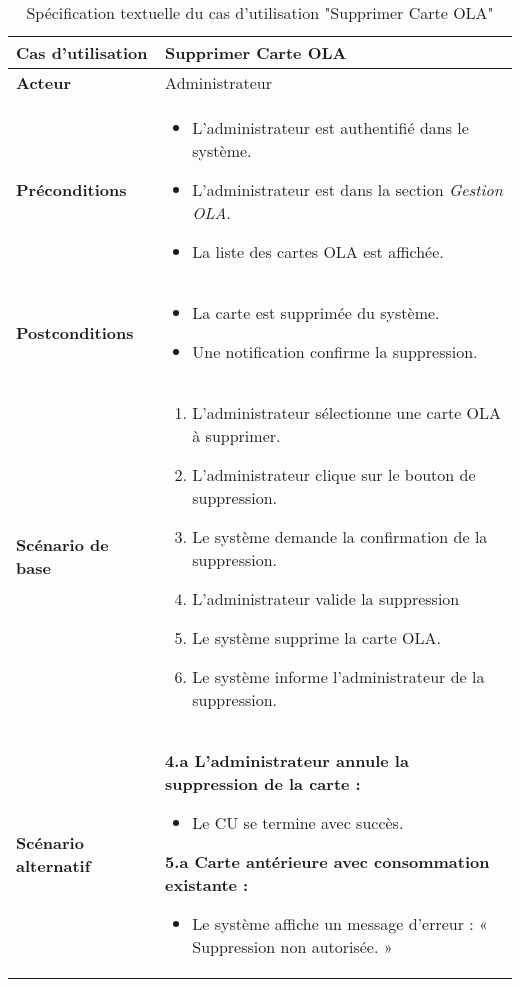 \documentclass[a4paper,11pt]{report}
\begin{document}
\begin{table}[H]
  \centering
  \renewcommand{\arraystretch}{1.5}
  \caption{Spécification textuelle du cas d'utilisation "Supprimer Carte OLA"}
  \begin{tabularx}{\textwidth}{|l|X|}
    \hline
    \textbf{Cas d'utilisation} & Supprimer Carte OLA \\ \hline
    \textbf{Acteur} & Administrateur \\ \hline
    \textbf{Préconditions} & 
    \begin{itemize}
      \item L’administrateur est authentifié dans le système.
      \item L'administrateur est dans la section \textit{Gestion OLA}.
      \item La liste des cartes OLA est affichée.
    \end{itemize} \\ \hline
    \textbf{Postconditions} & 
    \begin{itemize}
      \item La carte est supprimée du système.
      \item Une notification confirme la suppression.
    \end{itemize} \\ \hline
    \textbf{Scénario de base} & 
    \begin{enumerate}
      \item L’administrateur sélectionne une carte OLA à supprimer.
      \item L’administrateur clique sur le bouton de suppression.
      \item Le système demande la confirmation de la suppression.
      \item L’administrateur valide la suppression
      \item Le système supprime la carte OLA.
      \item Le système informe l’administrateur de la suppression.
    \end{enumerate} \\ \hline
    \textbf{Scénario alternatif} & 
    \textbf{4.a L'administrateur annule la suppression de la carte :}
    \begin{itemize}
      \item Le CU se termine avec succès.
    \end{itemize}
    \textbf{5.a Carte antérieure avec consommation existante :}
    \begin{itemize}
      \item Le système affiche un message d’erreur : « Suppression non autorisée. »
    \end{itemize} \\ \hline
    
  \end{tabularx}
\end{table}
\end{document}
